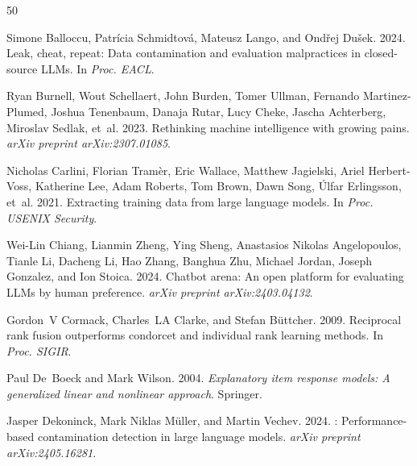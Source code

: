 \documentclass[11pt,a4paper]{article}
\begin{document}
%
%

\begin{thebibliography}{50}

Simone Balloccu, Patrícia Schmidtová, Mateusz Lango, and Ondřej Dušek. 2024.
\newblock Leak, cheat, repeat: Data contamination and evaluation malpractices in closed-source {LLM}s.
\newblock In \emph{Proc. EACL}.

Ryan Burnell, Wout Schellaert, John Burden, Tomer Ullman, Fernando Martinez-Plumed, Joshua Tenenbaum, Danaja Rutar, Lucy Cheke, Jascha Achterberg, Miroslav Sedlak, et~al. 2023.
\newblock Rethinking machine intelligence with growing pains.
\newblock \emph{arXiv preprint arXiv:2307.01085}.

Nicholas Carlini, Florian Tramèr, Eric Wallace, Matthew Jagielski, Ariel Herbert-Voss, Katherine Lee, Adam Roberts, Tom Brown, Dawn Song, Úlfar Erlingsson, et~al. 2021.
\newblock Extracting training data from large language models.
\newblock In \emph{Proc. USENIX Security}.

Wei-Lin Chiang, Lianmin Zheng, Ying Sheng, Anastasios Nikolas Angelopoulos, Tianle Li, Dacheng Li, Hao Zhang, Banghua Zhu, Michael Jordan, Joseph Gonzalez, and Ion Stoica. 2024.
\newblock Chatbot arena: An open platform for evaluating {LLM}s by human preference.
\newblock \emph{arXiv preprint arXiv:2403.04132}.

Gordon~V Cormack, Charles~LA Clarke, and Stefan Büttcher. 2009.
\newblock Reciprocal rank fusion outperforms condorcet and individual rank learning methods.
\newblock In \emph{Proc. SIGIR}.

Paul De~Boeck and Mark Wilson. 2004.
\newblock \emph{Explanatory item response models: A generalized linear and nonlinear approach}.
\newblock Springer.

Jasper Dekoninck, Mark Niklas Müller, and Martin Vechev. 2024.
: Performance-based contamination detection in large language models.
\newblock \emph{arXiv preprint arXiv:2405.16281}.


\end{thebibliography}
\end{document}
